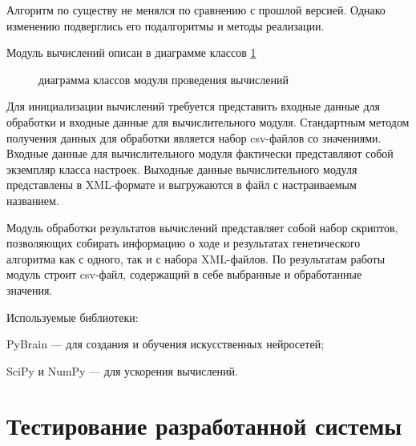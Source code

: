 \documentclass[utf8,usehyperref,14pt]{G7-32}
\begin{document}
Алгоритм по существу не менялся по сравнению с прошлой версией. Однако изменению подверглись его подалгоритмы и методы реализации.

Модуль вычислений описан в диаграмме классов \ref{class-diagram}
\begin{figure}[H]
  \caption{диаграмма классов модуля проведения вычислений}\label{class-diagram}
\end{figure}
Для инициализации вычислений требуется представить входные данные для обработки и входные данные для вычислительного модуля. Стандартным методом получения данных для обработки является набор csv-файлов со значениями. Входные данные для вычислительного модуля фактически представляют собой экземпляр класса настроек. Выходные данные вычислительного модуля представлены в XML-формате и выгружаются в файл с настраиваемым названием.

Модуль обработки результатов вычислений представляет собой набор скриптов, позволяющих собирать информацию о ходе и результатах генетического алгоритма как с одного, так и с набора XML-файлов. По результатам работы модуль строит csv-файл, содержащий в себе выбранные и обработанные значения.
 
\par{Используемые библиотеки:}
\par{PyBrain --- для создания и обучения искусственных нейросетей;}
\par{SciPy и NumPy --- для ускорения вычислений.} \cite{SciPy}

\chapter{Тестирование разработанной системы}
\end{document}
